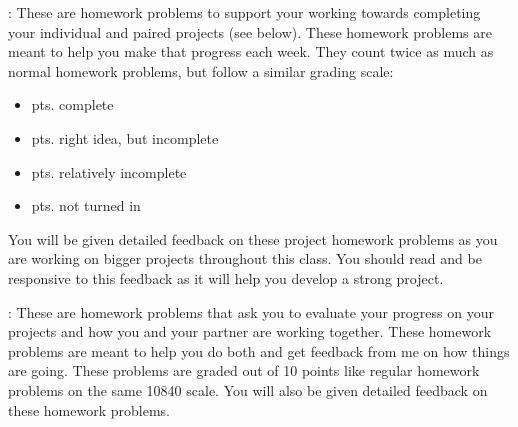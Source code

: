 \documentclass[letterpaper,10pt,english]{jupyterBook}
\begin{document}
\sphinxAtStartPar
{}: These are homework problems to support your working towards completing your individual and paired projects (see below).  These homework problems are meant to help you make that progress each week. They count twice as much as normal homework problems, but follow a similar grading scale:
\begin{itemize}
\item {} 
 pts. complete

\item {} 
 pts. right idea, but incomplete

\item {} 
 pts. relatively incomplete

\item {} 
 pts. not turned in

\end{itemize}

\sphinxAtStartPar
You will be given detailed feedback on these project homework problems as you are working on bigger projects throughout this class. You should read and be responsive to this feedback as it will help you develop a strong project.

\sphinxAtStartPar
{}: These are homework problems that ask you to evaluate your progress on your projects and how you and your partner are working together.  These homework problems are meant to help you do both and get feedback from me on how things are going. These problems are graded out of 10 points like regular homework problems on the same 10\sphinxhyphen{}8\sphinxhyphen{}4\sphinxhyphen{}0 scale. You will also be given detailed feedback on these homework problems.
\end{document}
